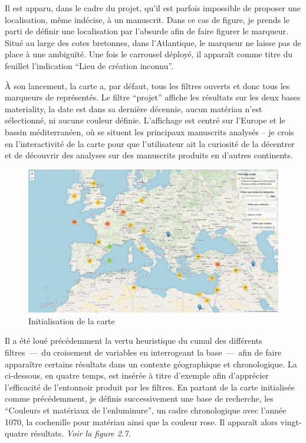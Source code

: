 Il est apparu, dans le cadre du projet, qu’il est parfois impossible de proposer une localisation, même indécise, à un manuscrit. Dans ce cas de figure, je prends le parti de définir une localisation par l’absurde afin de faire figurer le marqueur. Situé au large des cotes bretonnes, dans l’Atlantique, le marqueur ne laisse pas de place à une ambiguïté. Une fois le carrousel déployé, il apparaît comme titre du feuillet l’indication \enquote{Lieu de création inconnu}.\\\par
À son lancement, la carte a, par défaut, tous les filtres ouverts et donc tous les marqueurs de représentés. Le filtre \enquote{projet} affiche les résultats sur les deux bases materiality, la date est dans sa dernière décennie, aucun matériau n’est sélectionné, ni aucune couleur définie. L’affichage est centré sur l’Europe et le bassin méditerranéen, où se situent les principaux manuscrits analysés – je crois en l’interactivité de la carte pour que l’utilisateur ait la curiosité de la décentrer et de découvrir des analyses sur des manuscrits produits en d’autres continents. \par

\begin{figure}[H]
	\centering
	\includegraphics[width=\textwidth]{./textes/chap2/filtre-initialisation.jpg}
	\caption{Initialisation de la carte}
	\label{fig:info}
\end{figure}

Il a été loué précédemment la vertu heuristique du cumul des différents filtres~—~du croisement de variables en interrogeant la base~—~afin de faire apparaître certains résultats dans un contexte géographique et chronologique. La  ci-dessous, en quatre temps, est insérée à titre d’exemple afin d’apprécier l’efficacité de l’entonnoir produit par les filtres. En partant de la carte initialisée comme précédemment, je définis successivement une base de recherche, les \enquote{Couleurs et matériaux de l’enluminure}, un cadre chronologique avec l’année 1070, la cochenille pour matériau ainsi que la couleur rose. Il apparaît alors vingt-quatre résultats. \textit{Voir la figure 2.7.}\par

